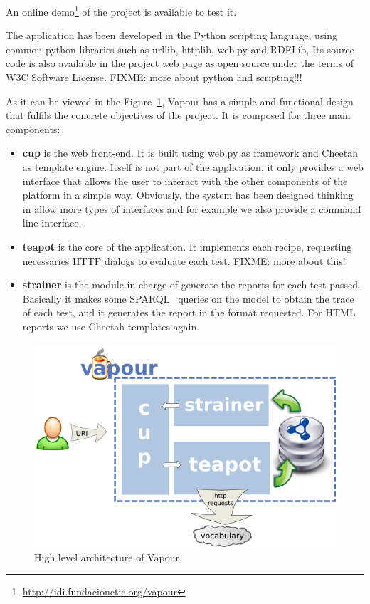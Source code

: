 An online demo\footnote{\url{http://idi.fundacionctic.org/vapour}} of the project
is available to test it.

The application has been developed in the Python scripting language, using common
python libraries such as urllib, httplib, web.py and RDFLib, Its source code is 
also available in the project web page as open source under the terms of W3C 
Software License.
FIXME: more about python and scripting!!!

As it can be viewed in the Figure~\ref{fig:arch}, Vapour has a simple and functional
design that fulfils the concrete objectives of the project. It is composed for three
main components:

\begin{itemize}

  \item \textbf{cup} is the web front-end. It is built using web.py as framework
        and Cheetah as template engine. Itself is not part of the application,
        it only provides a web interface that allows the user to interact with
        the other components of the platform in a simple way. Obviously, the
        system has been designed thinking in allow more types of interfaces
        and for example we also provide a command line interface.

  \item \textbf{teapot} is the core of the application. It implements each
        recipe, requesting necessaries HTTP dialogs to evaluate each test.
        FIXME: more about this!

  \item \textbf{strainer} is the module in charge of generate the reports for
        each test passed. Basically it makes some SPARQL~\cite{SPARQL} queries
        on the model to obtain the trace of each test, and it generates the
        report in the format requested. For HTML reports we use Cheetah templates
        again.

\end{itemize}

\begin{figure}
 \centering
 \includegraphics[width=12cm]{images/arch.png}
 \caption{\label{fig:arch}High level architecture of Vapour.}
\end{figure}

